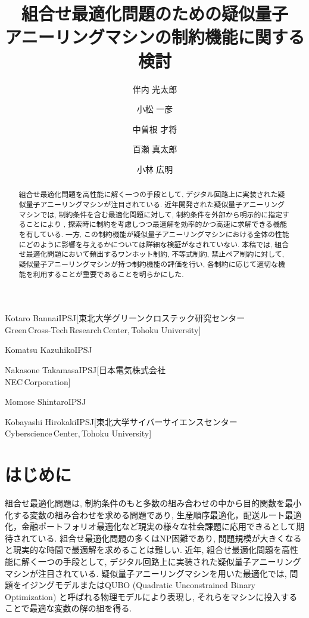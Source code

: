 \documentclass[submit,techrep,noauthor]{ipsj}
\begin{document}
\title{組合せ最適化問題のための疑似量子\\アニーリングマシンの制約機能に関する検討}

\author{伴内 光太郎}{Kotaro Bannai}{IPSJ}[東北大学グリーンクロステック研究センター\\Green\,Cross-Tech\,Research\,Center{,}\,Tohoku University]
\author{小松 一彦}{Komatsu Kazuhiko}{IPSJ}
\author{中曽根 才将}{Nakasone Takamasa}{IPSJ}[日本電気株式会社\\NEC\,Corporation]
\author{百瀬 真太郎}{Momose Shintaro}{IPSJ}
\author{小林 広明}{Kobayashi Hirokaki}{IPSJ}[東北大学サイバーサイエンスセンター\\Cyberscience\,Center{,}\,Tohoku University]

\begin{abstract}
組合せ最適化問題を高性能に解く一つの手段として, デジタル回路上に実装された疑似量子アニーリングマシンが注目されている. 近年開発された疑似量子アニーリングマシンでは, 制約条件を含む最適化問題に対して, 制約条件を外部から明示的に指定することにより
, 探索時に制約を考慮しつつ最適解を効率的かつ高速に求解できる機能を有している. 一方, この制約機能が疑似量子アニーリングマシンにおける全体の性能にどのように影響を与えるかについては詳細な検証がなされていない. 本稿では, 組合せ最適化問題において頻出するワンホット制約, 不等式制約, 禁止ペア制約に対して, 疑似量子アニーリングマシンが持つ制約機能の評価を行い, 各制約に応じて適切な機能を利用することが重要であることを明らかにした.
\end{abstract}

\maketitle

\section{はじめに}
組合せ最適化問題は, 制約条件のもと多数の組み合わせの中から目的関数を最小化する変数の組み合わせを求める問題であり, 生産順序最適化，配送ルート最適化，金融ポートフォリオ最適化など現実の様々な社会課題に応用できるとして期待されている. 組合せ最適化問題の多くはNP困難であり, 問題規模が大きくなると現実的な時間で最適解を求めることは難しい. 近年, 組合せ最適化問題を高性能に解く一つの手段として, デジタル回路上に実装された疑似量子アニーリングマシンが注目されている. 疑似量子アニーリングマシンを用いた最適化では, 問題をイジングモデルまたはQUBO (Quadratic Unconstrained Binary Optimization) と呼ばれる物理モデルにより表現し, それらをマシンに投入することで最適な変数の解の組を得る.
\end{document}
